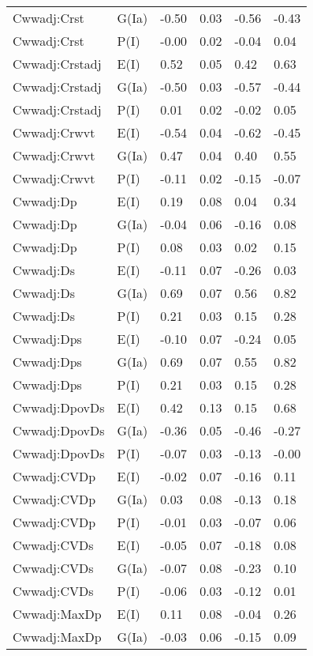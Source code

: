 \begin{center}
\begin{longtable}{|p{1.1in}|p{0.7in}|p{0.7in}|p{0.6in}|p{0.6in}|p{0.6in}|}
  Cwwadj:Crst & G(Ia) & -0.50 & 0.03 & -0.56 & -0.43 \\ 
  Cwwadj:Crst & P(I) & -0.00 & 0.02 & -0.04 & 0.04 \\ 
  Cwwadj:Crstadj & E(I) & 0.52 & 0.05 & 0.42 & 0.63 \\ 
  Cwwadj:Crstadj & G(Ia) & -0.50 & 0.03 & -0.57 & -0.44 \\ 
  Cwwadj:Crstadj & P(I) & 0.01 & 0.02 & -0.02 & 0.05 \\ 
  Cwwadj:Crwvt & E(I) & -0.54 & 0.04 & -0.62 & -0.45 \\ 
  Cwwadj:Crwvt & G(Ia) & 0.47 & 0.04 & 0.40 & 0.55 \\ 
  Cwwadj:Crwvt & P(I) & -0.11 & 0.02 & -0.15 & -0.07 \\ 
  Cwwadj:Dp & E(I) & 0.19 & 0.08 & 0.04 & 0.34 \\ 
  Cwwadj:Dp & G(Ia) & -0.04 & 0.06 & -0.16 & 0.08 \\ 
  Cwwadj:Dp & P(I) & 0.08 & 0.03 & 0.02 & 0.15 \\ 
  Cwwadj:Ds & E(I) & -0.11 & 0.07 & -0.26 & 0.03 \\ 
  Cwwadj:Ds & G(Ia) & 0.69 & 0.07 & 0.56 & 0.82 \\ 
  Cwwadj:Ds & P(I) & 0.21 & 0.03 & 0.15 & 0.28 \\ 
  Cwwadj:Dps & E(I) & -0.10 & 0.07 & -0.24 & 0.05 \\ 
  Cwwadj:Dps & G(Ia) & 0.69 & 0.07 & 0.55 & 0.82 \\ 
  Cwwadj:Dps & P(I) & 0.21 & 0.03 & 0.15 & 0.28 \\ 
  Cwwadj:DpovDs & E(I) & 0.42 & 0.13 & 0.15 & 0.68 \\ 
  Cwwadj:DpovDs & G(Ia) & -0.36 & 0.05 & -0.46 & -0.27 \\ 
  Cwwadj:DpovDs & P(I) & -0.07 & 0.03 & -0.13 & -0.00 \\ 
  Cwwadj:CVDp & E(I) & -0.02 & 0.07 & -0.16 & 0.11 \\ 
  Cwwadj:CVDp & G(Ia) & 0.03 & 0.08 & -0.13 & 0.18 \\ 
  Cwwadj:CVDp & P(I) & -0.01 & 0.03 & -0.07 & 0.06 \\ 
  Cwwadj:CVDs & E(I) & -0.05 & 0.07 & -0.18 & 0.08 \\ 
  Cwwadj:CVDs & G(Ia) & -0.07 & 0.08 & -0.23 & 0.10 \\ 
  Cwwadj:CVDs & P(I) & -0.06 & 0.03 & -0.12 & 0.01 \\ 
  Cwwadj:MaxDp & E(I) & 0.11 & 0.08 & -0.04 & 0.26 \\ 
  Cwwadj:MaxDp & G(Ia) & -0.03 & 0.06 & -0.15 & 0.09 \\ 

\end{longtable}
\end{center}
